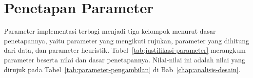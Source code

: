 \FloatBarrier

\section{Penetapan Parameter}
\label{sec:justifikasi-parameter}

Parameter implementasi terbagi menjadi tiga kelompok menurut dasar penetapannya, yaitu parameter yang mengikuti rujukan, parameter yang dihitung dari data, dan parameter heuristik. Tabel~\ref{tab:justifikasi-parameter} merangkum parameter beserta nilai dan dasar penetapannya. Nilai-nilai ini adalah nilai yang dirujuk pada Tabel~\ref{tab:parameter-pengambilan} di Bab~\ref{chap:analisis-desain}.

